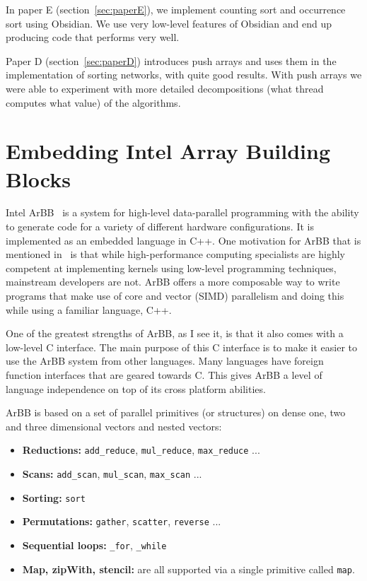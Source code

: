 \documentclass[a4paper]{book}
\begin{document}
In paper E (section~\ref{sec:paperE}), we implement counting sort and occurrence sort 
using Obsidian. We use very low-level features of Obsidian and end up producing 
code that performs very well. 

Paper D (section~\ref{sec:paperD}) introduces push arrays and uses them in the 
implementation of sorting networks, with quite good results. With push arrays we 
were able to experiment with more detailed decompositions (what thread computes 
what value) of the algorithms. 

\FloatBarrier 
%
%
\section{Embedding Intel Array Building Blocks} 

Intel ArBB~\citet{ARBB2011} is a system for high-level data-parallel programming with the 
ability to generate code for a variety of different hardware configurations. It is implemented 
as an embedded language in C++. One motivation for ArBB that is mentioned in~\citet{ARBB2011} is 
that while high-performance computing specialists are highly competent at implementing 
kernels using low-level programming techniques, mainstream developers are not. ArBB offers 
a more composable way to write programs that make use of core and vector (SIMD) parallelism and 
doing this while using a familiar language, C++.  

One of the greatest strengths of ArBB, as I see it, is that it also comes with a low-level C 
interface. The main purpose of this C interface is to make it easier to use the ArBB system 
from other languages. Many languages have foreign function interfaces that are geared towards C.
This gives ArBB a level of language independence on top of its cross platform abilities.  


ArBB is based on a set of parallel primitives (or structures) on dense one, two and three dimensional vectors and nested vectors: 
\begin{itemize} 
\item {\bf Reductions:}   {\tt add\_reduce}, {\tt mul\_reduce}, {\tt max\_reduce} ... 
\item {\bf Scans:}        {\tt add\_scan}, {\tt mul\_scan}, {\tt max\_scan} ... 
\item {\bf Sorting:}      {\tt sort} 
\item {\bf Permutations:} {\tt gather}, {\tt scatter}, {\tt reverse} ...
\item {\bf Sequential loops:} {\tt \_for}, {\tt \_while} 
\item {\bf Map, zipWith, stencil:} are all supported via a single primitive called {\tt map}.
\end{itemize}
\end{document}
